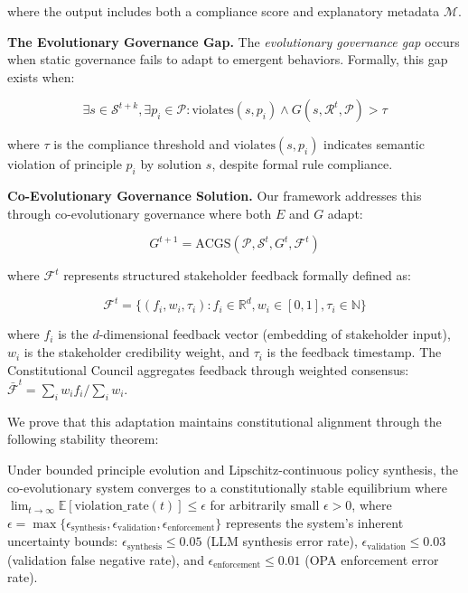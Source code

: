 \documentclass[sigconf,natbib]{acmart}
\begin{document}
where the output includes both a compliance score and explanatory metadata $\mathcal{M}$.

\textbf{The Evolutionary Governance Gap.} The \textit{evolutionary governance gap} occurs when static governance fails to adapt to emergent behaviors. Formally, this gap exists when:

$$\exists s \in \mathcal{S}^{t+k}, \exists p_i \in \mathcal{P}: \text{violates}(s, p_i) \land G(s, \mathcal{R}^t, \mathcal{P}) > \tau$$

where $\tau$ is the compliance threshold and $\text{violates}(s, p_i)$ indicates semantic violation of principle $p_i$ by solution $s$, despite formal rule compliance.

\textbf{Co-Evolutionary Governance Solution.} Our framework addresses this through co-evolutionary governance where both $E$ and $G$ adapt:

$$G^{t+1} = \text{ACGS}(\mathcal{P}, \mathcal{S}^t, G^t, \mathcal{F}^t)$$

where $\mathcal{F}^t$ represents structured stakeholder feedback formally defined as:

$$\mathcal{F}^t = \{(f_i, w_i, \tau_i) : f_i \in \mathbb{R}^d, w_i \in [0,1], \tau_i \in \mathbb{N}\}$$

where $f_i$ is the $d$-dimensional feedback vector (embedding of stakeholder input), $w_i$ is the stakeholder credibility weight, and $\tau_i$ is the feedback timestamp. The Constitutional Council aggregates feedback through weighted consensus: $\bar{\mathcal{F}}^t = \sum_{i} w_i f_i / \sum_{i} w_i$.

We prove that this adaptation maintains constitutional alignment through the following stability theorem:

\begin{theorem}
\label{thm:constitutional_stability}
Under bounded principle evolution and Lipschitz-continuous policy synthesis, the co-evolutionary system converges to a constitutionally stable equilibrium where $\lim_{t \to \infty} \mathbb{E}[\text{violation\_rate}(t)] \leq \epsilon$ for arbitrarily small $\epsilon > 0$, where $\epsilon = \max\{\epsilon_{\text{synthesis}}, \epsilon_{\text{validation}}, \epsilon_{\text{enforcement}}\}$ represents the system's inherent uncertainty bounds: $\epsilon_{\text{synthesis}} \leq 0.05$ (LLM synthesis error rate), $\epsilon_{\text{validation}} \leq 0.03$ (validation false negative rate), and $\epsilon_{\text{enforcement}} \leq 0.01$ (OPA enforcement error rate).
\end{theorem}
\end{document}
